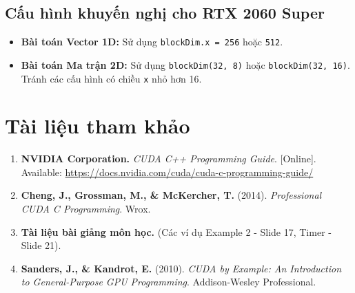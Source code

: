 \documentclass{article}
\begin{document}
    \subsection{Cấu hình khuyến nghị cho RTX 2060 Super}

    \begin{itemize}
        \item \textbf{Bài toán Vector 1D:} Sử dụng \lstinline|blockDim.x = 256| hoặc \lstinline|512|.
        \item \textbf{Bài toán Ma trận 2D:} Sử dụng \lstinline|blockDim(32, 8)| hoặc \lstinline|blockDim(32, 16)|. Tránh các cấu hình có chiều \lstinline|x| nhỏ hơn 16.
    \end{itemize}

    \section{Tài liệu tham khảo}

    \begin{enumerate}
        \item \textbf{NVIDIA Corporation.} \textit{CUDA C++ Programming Guide}. [Online]. Available: \url{https://docs.nvidia.com/cuda/cuda-c-programming-guide/}
        \item \textbf{Cheng, J., Grossman, M., \& McKercher, T.} (2014). \textit{Professional CUDA C Programming}. Wrox.
        \item \textbf{Tài liệu bài giảng môn học.} (Các ví dụ Example 2 - Slide 17, Timer - Slide 21).
        \item \textbf{Sanders, J., \& Kandrot, E.} (2010). \textit{CUDA by Example: An Introduction to General-Purpose GPU Programming}. Addison-Wesley Professional.
    \end{enumerate}

    
\end{document}
